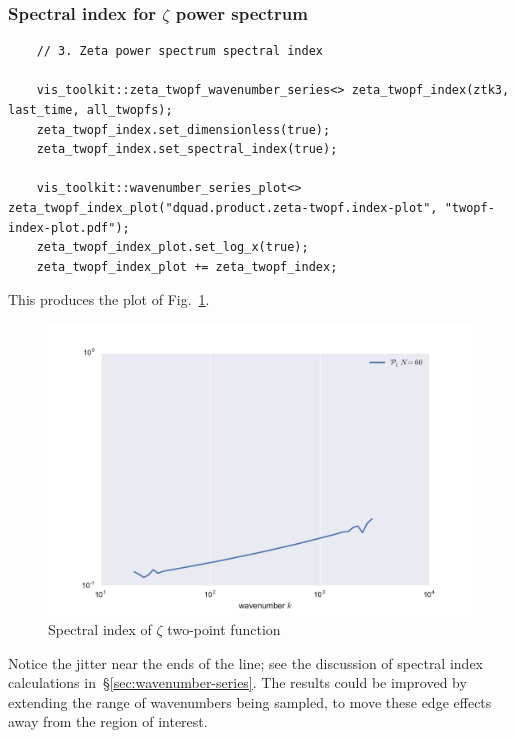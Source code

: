 \documentclass[11pt,a4paper]{article}
\begin{document}
\subsubsection{Spectral index for $\zeta$ power spectrum}
\begin{verbatim}
    // 3. Zeta power spectrum spectral index

    vis_toolkit::zeta_twopf_wavenumber_series<> zeta_twopf_index(ztk3, last_time, all_twopfs);
    zeta_twopf_index.set_dimensionless(true);
    zeta_twopf_index.set_spectral_index(true);

    vis_toolkit::wavenumber_series_plot<> zeta_twopf_index_plot("dquad.product.zeta-twopf.index-plot", "twopf-index-plot.pdf");
    zeta_twopf_index_plot.set_log_x(true);
    zeta_twopf_index_plot += zeta_twopf_index;
\end{verbatim}
This produces the plot of Fig.~\ref{fig:twopf-index-plot}.
\begin{figure}
    \begin{center}
        \includegraphics[scale=0.75]{Outputs/twopf-index-plot}    
    \end{center}
    \caption{\label{fig:twopf-index-plot}Spectral index of $\zeta$ two-point function}
\end{figure}
Notice the jitter near the ends of the line;
see the discussion of spectral index calculations in~\S\ref{sec:wavenumber-series}.
The results could be improved by extending the range of wavenumbers being sampled,
to move these edge effects away from the region of interest.
\end{document}
